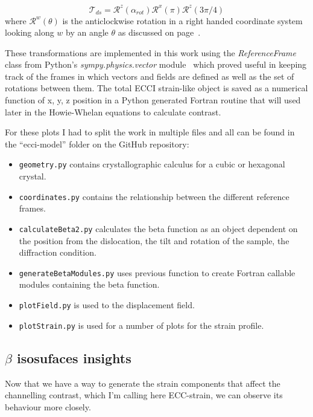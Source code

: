 \begin{equation}
    \mathcal{T}_{ds} = \mathcal{R}^z(\alpha_{rot}) \mathcal{R}^x(\pi) \mathcal{R}^z(3\pi/4)
\end{equation}
where $\mathcal{R}^w(\theta)$ is the anticlockwise rotation in a right handed coordinate system looking along $w$ by an angle $\theta$ as discussed on page~\pageref{subchap:basicRot}.

These transformations are implemented in this work using the \textit{ReferenceFrame} class from Python's
\textit{sympy.physics.vector} module~\cite{sympy} which proved useful in keeping track of the frames in which vectors and fields
are defined as well as the set of rotations between them. The total ECCI strain-like object is saved as a numerical
function of x, y, z position in a Python generated Fortran routine that will used later in the Howie-Whelan equations to calculate contrast. 

For these plots I had to split the work in multiple files and all can be found in the ``ecci-model'' folder on the GitHub repository: 
\begin{itemize}
    \item \texttt{geometry.py} contains crystallographic calculus for a cubic or hexagonal crystal.
    \item \texttt{coordinates.py} contains the relationship between the different reference frames.
    \item \texttt{calculateBeta2.py} calculates the beta function as an object dependent on the position from the dislocation, the tilt and rotation of the sample, the diffraction condition.
    \item \texttt{generateBetaModules.py} uses previous function to create Fortran callable modules containing the beta function.
    \item \texttt{plotField.py} is used to the displacement field.
    \item \texttt{plotStrain.py} is used for a number of plots for the strain profile.
\end{itemize}



\subsection{\texorpdfstring{$\beta$}{beta} isosufaces insights}
\label{sec:betacomparisons}
Now that we have a way to generate the strain components that affect the channelling contrast, which I'm calling here ECC-strain, we can observe its behaviour more closely. 

